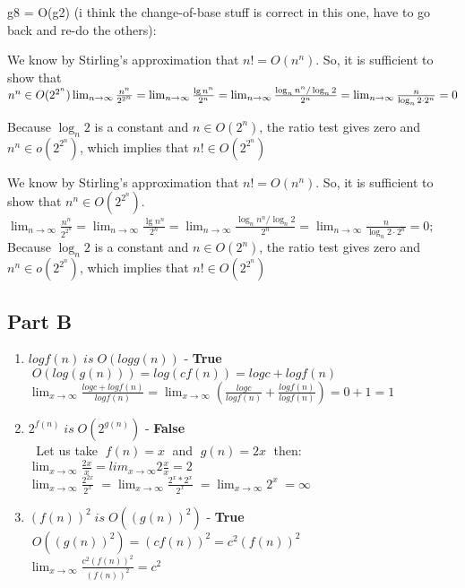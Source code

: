 \documentclass{article}
\begin{document}
g8 = O(g2) (i think the change-of-base stuff is correct in this one, have
to go back and re-do the others):

We know by Stirling's approximation that $n! = O(n^n)$. So, it is
sufficient to show that $n^n \in O(2^{2^n})\\
\lim_{n \to \infty}\frac{n^n}{2^{2^n}} = \lim_{n \to \infty}\frac{\lg
n^n}{2^n} = \lim_{n \to \infty}\frac{\log_n n^n/\log_n2}{2^n} = \lim_{n \to
\infty}\frac{n}{\log_n2\cdot2^n} = 0$

Because $\log_n2$ is a constant and $n \in O(2^n)$, the ratio test gives
zero and $n^n \in o(2^{2^n})$, which implies that $n! \in O(2^{2^n})$

We know by Stirling's approximation that $n! = O(n^n)$. So, it is
sufficient to show that $n^n \in O(2^{2^n})$.
$
\lim_{n \to \infty}\frac{n^n}{2^{2^n}} = \lim_{n \to \infty}\frac{\lg
n^n}{2^n} = \lim_{n \to \infty}\frac{\log_n n^n/\log_n2}{2^n} = \lim_{n \to
\infty}\frac{n}{\log_n2\cdot2^n} = 0;$
 \\ Because $\log_n 2$ is a constant and $n \in O(2^n)$, the ratio test gives
 zero and $n^n \in o(2^{2^n})$, which implies that $n! \in O(2^{2^n})$

\subsection*{Part B}
\begin{enumerate}
  \item $log {f(n)} \; is \; O(log {g(n)})$ - \textbf{True}
    \\ $\; O(log(g(n))) = log {(cf(n))} = log c + log {f(n)}$
	\\ $\lim_{x\to\infty}\frac{log c + log {f(n)}}{log {f(n)}} =
	    \lim_{x\to\infty}(\frac{log c}{log {f(n)}} + \frac{log {f(n)}}{log
	    {f(n)}}) = 0 + 1 = 1$
  \item $2^{f(n)} \; is \; O(2^{g(n)})$ - \textbf{False}
    \\ $\; $ Let us take $\; f(n) = x \;$ and $\; g(n) = 2x \;$ then:
    \\ $\lim_{x\to\infty}\frac{2x}{x} = lim_{x\to\infty}2\frac{x}{x} = 2$
    \\ $\lim_{x\to\infty}\frac{2^{2x}}{2^x} \; =
        \lim_{x\to\infty}\frac{2^x*2^x}{2^x} \; =
        \lim_{x\to\infty}{2^x} \; = \infty$
  \item $(f(n))^2 \; is \; O((g(n))^2)$ - \textbf{True}
    \\ $\; O((g(n))^2) = (cf(n))^2 = c^2(f(n))^2$
    \\ $\lim_{x\to\infty}\frac{c^2(f(n))^2}{(f(n))^2} = c^2$
\end{enumerate}
\vfill
\end{document}
